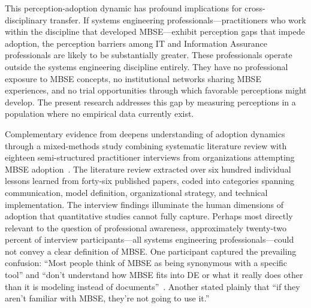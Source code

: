This perception-adoption dynamic has profound implications for cross-disciplinary transfer. If systems engineering professionals---practitioners who work within the discipline that developed MBSE---exhibit perception gaps that impede adoption, the perception barriers among IT and Information Assurance professionals are likely to be substantially greater. These professionals operate outside the systems engineering discipline entirely. They have no professional exposure to MBSE concepts, no institutional networks sharing MBSE experiences, and no trial opportunities through which favorable perceptions might develop. The present research addresses this gap by measuring perceptions in a population where no empirical data currently exist.

Complementary evidence from \citeauthor{Henderson_McDermott_Salado_2024} deepens understanding of adoption dynamics through a mixed-methods study combining systematic literature review with eighteen semi-structured practitioner interviews from organizations attempting MBSE adoption~\parencite{Henderson_McDermott_Salado_2024}. The literature review extracted over six hundred individual lessons learned from forty-six published papers, coded into categories spanning communication, model definition, organizational strategy, and technical implementation. The interview findings illuminate the human dimensions of adoption that quantitative studies cannot fully capture. Perhaps most directly relevant to the question of professional awareness, approximately twenty-two percent of interview participants---all systems engineering professionals---could not convey a clear definition of MBSE\@. One participant captured the prevailing confusion: ``Most people think of MBSE as being synonymous with a specific tool'' and ``don't understand how MBSE fits into DE or what it really does other than it is modeling instead of documents''~\parencite{Henderson_McDermott_Salado_2024}. Another stated plainly that ``if they aren't familiar with MBSE, they're not going to use it.''

